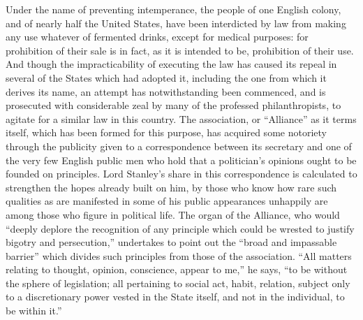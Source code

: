 \documentclass[11pt,openany]{book}
\begin{document}
Under the name of preventing intemperance, the people of one English colony, and of nearly half the United States, have been interdicted by law from making any use whatever of fermented drinks, except for medical purposes: for prohibition of their sale is in fact, as it is intended to be, prohibition of their use. And though the impracticability of executing the law has caused its repeal in several of the States which had adopted it, including the one from which it derives its name, an attempt has notwithstanding been commenced, and is prosecuted with considerable zeal by many of the professed philanthropists, to agitate for a similar law in this country. The association, or ``Alliance'' as it terms itself, which has been formed for this purpose, has acquired some notoriety through the publicity given to a correspondence between its secretary and one of the very few English public men who hold that a politician's opinions ought to be founded on principles. Lord Stanley's share in this correspondence is calculated to strengthen the hopes already built on him, by those who know how rare such qualities as are manifested in some of his public appearances unhappily are among those who figure in political life. The organ of the Alliance, who would ``deeply deplore the recognition of any principle which could be wrested to justify bigotry and persecution,'' undertakes to point out the ``broad and impassable barrier'' which divides such principles from those of the association. ``All matters relating to thought, opinion, conscience, appear to me,'' he says, ``to be without the sphere of legislation; all pertaining to social act, habit, relation, subject only to a discretionary power vested in the State itself, and not in the individual, to be within it.''
\end{document}
